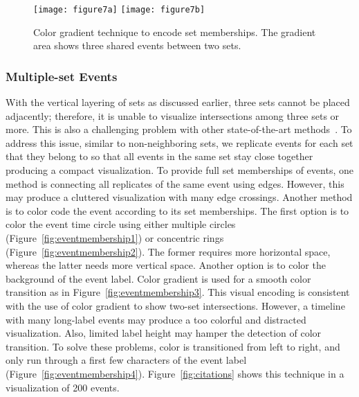 \begin{figure}[!htb]
	\centering
		{\texttt{[image: figure7a]}}
	\hfill
		{\texttt{[image: figure7b]}}
	\caption{Color gradient technique to encode set memberships. The gradient area shows three shared events between two sets.}
	\label{fig:gradient}
\end{figure}

\subsubsection{Multiple-set Events}
With the vertical layering of sets as discussed earlier, three sets cannot be placed adjacently; therefore, it is unable to visualize intersections among three sets or more. This is also a challenging problem with other state-of-the-art methods~\cite{Alsallakh2014}. To address this issue, similar to non-neighboring sets, we replicate events for each set that they belong to so that all events in the same set stay close together producing a compact visualization. To provide full set memberships of events, one method is connecting all replicates of the same event using edges. However, this may produce a cluttered visualization with many edge crossings. Another method is to color code the event according to its set memberships. The first option is to color the event time circle using either multiple circles (Figure~\ref{fig:eventmembership1}) or concentric rings (Figure~\ref{fig:eventmembership2}). The former requires more horizontal space, whereas the latter needs more vertical space. Another option is to color the background of the event label. Color gradient is used for a smooth color transition as in Figure~\ref{fig:eventmembership3}. This visual encoding is consistent with the use of color gradient to show two-set intersections. However, a timeline with many long-label events may produce a too colorful and distracted visualization. Also, limited label height may hamper the detection of color transition. To solve these problems, color is transitioned from left to right, and only run through a first few characters of the event label (Figure~\ref{fig:eventmembership4}). Figure~\ref{fig:citations} shows this technique in a visualization of 200 events.

